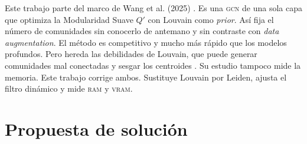 \documentclass[twoside,twocolumn,10pt]{article}
\begin{document}
Este trabajo parte del marco de Wang et al. (2025) \cite{Wang2025}. Es una \textsc{gcn} de una sola capa que optimiza la Modularidad Suave $Q'$ con Louvain como \textit{prior}. Así fija el número de comunidades sin conocerlo de antemano y sin contraste con \textit{data augmentation}. El método es competitivo y mucho más rápido que los modelos profundos. Pero hereda las debilidades de Louvain, que puede generar comunidades mal conectadas y sesgar los centroides \cite{Traag2019}. Su estudio tampoco mide la memoria. Este trabajo corrige ambos. Sustituye Louvain por Leiden, ajusta el filtro dinámico y mide \textsc{ram} y \textsc{vram}.

\section{Propuesta de solución}
\label{sec:propuesta}
\fontsize{10}{12}\selectfont
\end{document}
